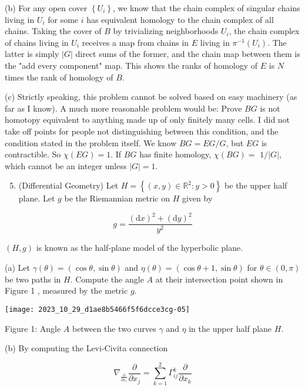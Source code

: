 \documentclass[10pt]{article}
\begin{document}
(b) For any open cover $\left\{U_{i}\right\}$, we know that the chain complex of singular chains living in $U_{i}$ for some $i$ has equivalent homology to the chain complex of all chains. Taking the cover of $B$ by trivializing neighborhoods $U_{i}$, the chain complex of chains living in $U_{i}$ receives a map from chains in $E$ living in $\pi^{-1}\left(U_{i}\right)$. The latter is simply $|G|$ direct sums of the former, and the chain map between them is the "add every component" map. This shows the ranks of homology of $E$ is $N$ times the rank of homology of $B$.

(c) Strictly speaking, this problem cannot be solved based on easy machinery (as far as I know). A much more reasonable problem would be: Prove $B G$ is not homotopy equivalent to anything made up of only finitely many cells. I did not take off points for people not distinguishing between this condition,
and the condition stated in the problem itself. We know $B G=E G / G$, but $E G$ is contractible. So $\chi(E G)=1$. If $B G$ has finite homology, $\chi(B G)=$ $1 /|G|$, which cannot be an integer unless $|G|=1$.

\begin{enumerate}
  \setcounter{enumi}{4}
  \item (Differential Geometry) Let $H=\left\{(x, y) \in \mathbb{R}^{2}: y>0\right\}$ be the upper half plane. Let $g$ be the Riemannian metric on $H$ given by
\end{enumerate}

$$
g=\frac{(\mathrm{d} x)^{2}+(\mathrm{d} y)^{2}}{y^{2}}
$$

$(H, g)$ is known as the half-plane model of the hyperbolic plane.

(a) Let $\gamma(\theta)=(\cos \theta, \sin \theta)$ and $\eta(\theta)=(\cos \theta+1, \sin \theta)$ for $\theta \in(0, \pi)$ be two paths in $H$. Compute the angle $A$ at their intersection point shown in Figure 1 , measured by the metric $g$.

\begin{center}
\texttt{[image: 2023\_10\_29\_d1ae8b5466f5f6dcce3cg-05]}
\end{center}

Figure 1: Angle $A$ between the two curves $\gamma$ and $\eta$ in the upper half plane $H$.

(b) By computing the Levi-Civita connection

$$
\nabla_{\frac{\partial}{\partial x_{i}}} \frac{\partial}{\partial x_{j}}=\sum_{k=1}^{2} \Gamma_{i j}^{k} \frac{\partial}{\partial x_{k}}
$$
\end{document}
